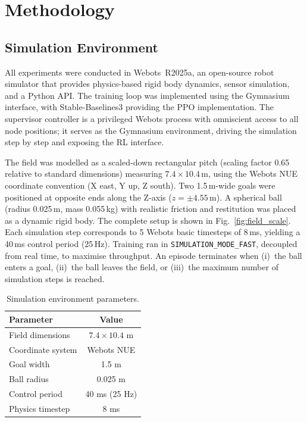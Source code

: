 \documentclass[conference]{IEEEtran}
\begin{document}
\section{Methodology} \label{sec:method}
\subsection{Simulation Environment}
All experiments were conducted in Webots~R2025a, an open-source robot simulator
that provides physics-based rigid body dynamics, sensor simulation, and a Python
API. The training loop was implemented using the Gymnasium interface, with
Stable-Baselines3 providing the PPO implementation. The supervisor controller is a
privileged Webots process with omniscient access to all node positions; it serves
as the Gymnasium environment, driving the simulation step by step and exposing the
RL interface.

The field was modelled as a scaled-down rectangular pitch (scaling factor 0.65
relative to standard dimensions) measuring $7.4 \times 10.4\,\mathrm{m}$, using the
Webots NUE coordinate convention (X east, Y up, Z south). Two 1.5\,m-wide goals
were positioned at opposite ends along the Z-axis ($z = \pm 4.55\,\mathrm{m}$). A
spherical ball (radius 0.025\,m, mass 0.055\,kg) with realistic friction and
restitution was placed as a dynamic rigid body. The complete setup is shown in
Fig.~\ref{fig:field_scale}. Each simulation step corresponds to 5 Webots basic
timesteps of 8\,ms, yielding a 40\,ms control period (25\,Hz). Training ran in
\texttt{SIMULATION\_MODE\_FAST}, decoupled from real time, to maximise throughput.
An episode terminates when (i)~the ball enters a goal, (ii)~the ball leaves the
field, or (iii)~the maximum number of simulation steps is reached.

\begin{table}[h]
    \centering
    \caption{Simulation environment parameters.}
    \label{tab:environment}
    \begin{tabular}{lc}
        \hline
        \textbf{Parameter} & \textbf{Value} \\
        \hline
        Field dimensions   & $7.4 \times 10.4$ m \\
        Coordinate system  & Webots NUE \\
        Goal width         & 1.5 m \\
        Ball radius        & 0.025 m \\
        Control period     & 40 ms (25 Hz) \\
        Physics timestep   & 8 ms \\
        \hline
    \end{tabular}
\end{table}
\end{document}
